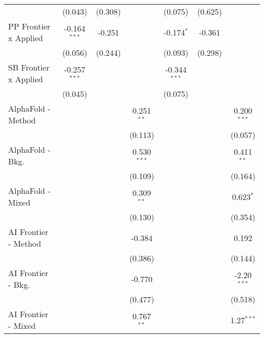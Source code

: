 \begin{tabular}{lcccccc}
                                  & (0.043)        & (0.308)       &                & (0.075)        & (0.625)       &   \\   
   PP Frontier x Applied          & -0.164$^{***}$ & -0.251        &                & -0.174$^{*}$   & -0.361        &   \\   
                                  & (0.056)        & (0.244)       &                & (0.093)        & (0.298)       &   \\   
   SB Frontier x Applied          & -0.257$^{***}$ &               &                & -0.344$^{***}$ &               &   \\   
                                  & (0.045)        &               &                & (0.075)        &               &   \\   
   AlphaFold - Method             &                &               & 0.251$^{**}$   &                &               & 0.200$^{***}$\\   
                                  &                &               & (0.113)        &                &               & (0.057)\\   
   AlphaFold - Bkg.               &                &               & 0.530$^{***}$  &                &               & 0.411$^{**}$\\   
                                  &                &               & (0.109)        &                &               & (0.164)\\   
   AlphaFold - Mixed              &                &               & 0.309$^{**}$   &                &               & 0.623$^{*}$\\   
                                  &                &               & (0.130)        &                &               & (0.354)\\   
   AI Frontier - Method           &                &               & -0.384         &                &               & 0.192\\   
                                  &                &               & (0.386)        &                &               & (0.144)\\   
   AI Frontier - Bkg.             &                &               & -0.770         &                &               & -2.20$^{***}$\\   
                                  &                &               & (0.477)        &                &               & (0.518)\\   
   AI Frontier - Mixed            &                &               & 0.767$^{**}$   &                &               & 1.27$^{***}$\\   

\end{tabular}

